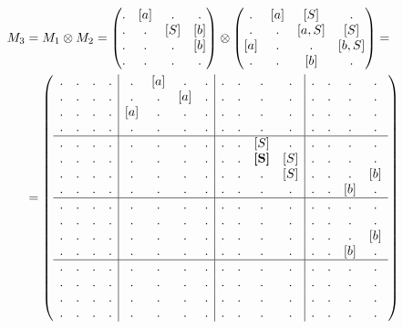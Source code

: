 \begin{example}
\begin{align}
M_3 &= M_1 \otimes M_2 = 
\begin{pmatrix} 
. & [a] & . & . \\
. & . & [S] & [b] \\
. & . & . & [b] \\
. & . & . & . 
\end{pmatrix}
\otimes 
\begin{pmatrix} 
. & [a] & [S] & . \\
. & . & [a,S] & [S] \\
[a] & . & . & [b,S] \\
. & . & [b] & . 
\end{pmatrix}
=\notag\\
&=
\left(\begin{array}{c c c c | c c c c | c c c c | c c c c } 
. & . & . & .  &  . & [a] & . & .  &  . & . & . & .    &  . & . & . & .   \\
. & . & . & .  &  . & . & [a] & .  &  . & . & . & .    &  . & . & . & .   \\
. & . & . & .  &  [a] & . & . & .  &  . & . & . & .    &  . & . & . & .   \\
. & . & . & .  &  . & . & . & .    &  . & . & . & .    &  . & . & . & .   \\
\hline
. & . & . & .  &  . & . & . & .    &  . & . & [S]          & .    &  . & . & . & .   \\
. & . & . & .  &  . & . & . & .    &  . & . & \textbf{[S]} & [S]  &  . & . & . & .   \\
. & . & . & .  &  . & . & . & .    &  . & . & .            & [S]  &  . & . & . & [b] \\
. & . & . & .  &  . & . & . & .    &  . & . & .            & .    &  . & . & [b] & . \\
\hline
. & . & . & .  &  . & . & . & .    &  . & . & . & .    &  . & . & . & .   \\
. & . & . & .  &  . & . & . & .    &  . & . & . & .    &  . & . & . & .   \\
. & . & . & .  &  . & . & . & .    &  . & . & . & .    &  . & . & . & [b] \\
. & . & . & .  &  . & . & . & .    &  . & . & . & .    &  . & . & [b] & . \\
\hline
. & . & . & .  &  . & . & . & .    &  . & . & . & .    &  . & . & . & .   \\
. & . & . & .  &  . & . & . & .    &  . & . & . & .    &  . & . & . & .   \\
. & . & . & .  &  . & . & . & .    &  . & . & . & .    &  . & . & . & .   \\
. & . & . & .  &  . & . & . & .    &  . & . & . & .    &  . & . & . & . 
\end{array}\right)
\label{eq:graph_tm}
\end{align}


\end{example}
